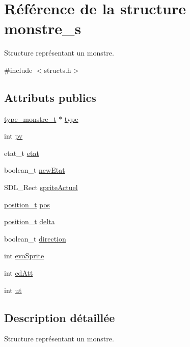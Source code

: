 \hypertarget{structmonstre__s}{}\section{Référence de la structure monstre\+\_\+s}
\label{structmonstre__s}


Structure représentant un monstre.  




{\ttfamily \#include $<$structs.\+h$>$}

\subsection*{Attributs publics}
\begin{DoxyCompactItemize}
\item 
\hyperlink{structtype__monstre__s}{type\+\_\+monstre\+\_\+t} $\ast$ \hyperlink{structmonstre__s_af58fb0da12d89fbdce602578f457560e}{type}
\item 
int \hyperlink{structmonstre__s_a1e26c0e85b90352f9496f331ec74e98d}{pv}
\item 
etat\+\_\+t \hyperlink{structmonstre__s_a38d270db8b7dd326f1e014eb3b72b740}{etat}
\item 
boolean\+\_\+t \hyperlink{structmonstre__s_a137937d4822ae2db1615ceeae7209e10}{new\+Etat}
\item 
S\+D\+L\+\_\+\+Rect \hyperlink{structmonstre__s_a7c57e6c890e0709f09b1df09c71a8daa}{sprite\+Actuel}
\item 
\hyperlink{structposition__s}{position\+\_\+t} \hyperlink{structmonstre__s_a972c2fb3087127d04bd3719d62c1030e}{pos}
\item 
\hyperlink{structposition__s}{position\+\_\+t} \hyperlink{structmonstre__s_a9a4bad53b10cc5379c594dd689750b0c}{delta}
\item 
boolean\+\_\+t \hyperlink{structmonstre__s_aa1a2d6868b660addc5855614f1849540}{direction}
\item 
int \hyperlink{structmonstre__s_a3815defb3b0db5e3b9fc71b77ddabeca}{evo\+Sprite}
\item 
int \hyperlink{structmonstre__s_ae6f4f8090a2bde0f555b00fc108c9130}{cd\+Att}
\item 
int \hyperlink{structmonstre__s_a0829b1dda3db793b717fa93466a686c6}{ut}
\end{DoxyCompactItemize}


\subsection{Description détaillée}
Structure représentant un monstre. 

